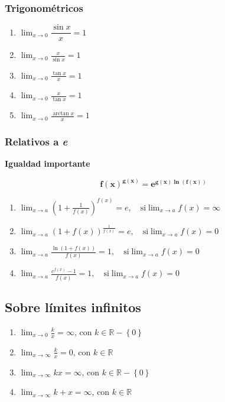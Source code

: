 \documentclass[11pt,titlepage]{article}
\newcommand{\commLim}[2]{\lim_{#1 \to #2}}
\newcommand{\displayLim}[2]{\displaystyle \commLim{#1}{#2}}
\newcommand{\littleTitle}[1]{
	\noindent \ignorespaces
	\small \textbf{#1} \normalsize
	\ignorespaces \ignorespacesafterend
}
\begin{document}
\subsubsection{Trigonométricos}
\begin{multicols}{3}
	\begin{enumerate}[label=\alph*.]
		\item $ \displayLim{x}{0} \dfrac{\sin x}{x} = 1 $
		\item $ \displayLim{x}{0} \frac{x}{\sin x} = 1 $
		\item $ \displayLim{x}{0} \frac{\tan x}{x} = 1 $
		\item $ \displayLim{x}{0} \frac{x}{\tan x} = 1 $
		\item $ \displayLim{x}{0} \frac{\arctan x}{x} = 1 $
	\end{enumerate}
\end{multicols}

\subsubsection{Relativos a \textit{e}}
\littleTitle{Igualdad importante}\par
	\begin{equation}
		\boldsymbol{f(x)^{g(x)} = e^{g(x) \ln(f(x))}}
	\end{equation}

\begin{enumerate}[label=\alph*.]
	\item $ \displayLim{x}{a} \left(1+\frac{1}{f(x)}\right)^{f(x)} = e, \quad	\text{si} \commLim{x}{a} f(x) = \infty $
	\item $ \displayLim{x}{a} (1+f(x))^{\frac{1}{f(x)}} = e, \quad	\text{si} \commLim{x}{a} f(x) = 0 $
	\item $ \displayLim{x}{a} \frac{\ln(1 + f(x))}{f(x)} = 1, \quad	\text{si} \commLim{x}{a} f(x) = 0 $
	\item $ \displayLim{x}{a} \frac{e^{f(x)}-1}{f(x)} = 1, \quad \text{si} \commLim{x}{a} f(x) = 0 $
\end{enumerate}

\subsection{Sobre límites infinitos}
\begin{multicols}{2}
	\begin{enumerate}[label=\alph*.]
		\item $ \displayLim{x}{0} \frac{k}{x} = \infty$, \quad con $ k \in \mathbb{R} - \left\{0 \right\} $
		\item $ \displayLim{x}{\infty} \frac{k}{x} = 0$, \quad con $ k \in \mathbb{R} $
		\item $ \displayLim{x}{\infty} kx = \infty$, \quad con $k \in \mathbb{R} - \left\{0\right\} $
		\item $ \displayLim{x}{\infty} k + x = \infty$, \quad con $ k \in \mathbb{R} $
	\end{enumerate}
\end{multicols}
\end{document}
